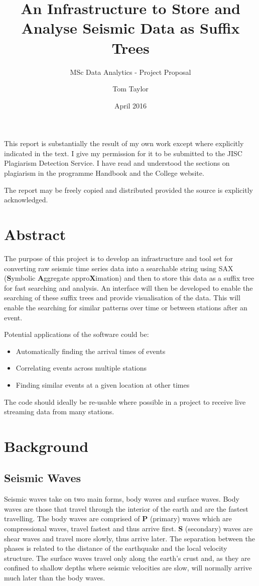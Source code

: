 \documentclass[11pt]{scrartcl}
\title{An Infrastructure to Store and Analyse Seismic Data as Suffix Trees}
\subtitle{MSc Data Analytics - Project Proposal}
\date{April 2016}
\author{Tom Taylor}
\begin{document}
\maketitle
\begin{itshape}
	\noindent This report is substantially the result of my own work except where explicitly indicated in the text. I give my permission for it to be submitted to the JISC Plagiarism Detection Service. I have read and understood the sections on plagiarism in the programme Handbook and the College website.
	
	\noindent The report may be freely copied and distributed provided the source is explicitly acknowledged.
\end{itshape}

\tableofcontents

\newpage

\section{Abstract}
	The purpose of this project is to develop an infrastructure and tool set for converting raw seismic time series data into a searchable string using SAX (\textbf{S}ymbolic \textbf{A}ggregate appro\textbf{X}imation) and then to store this data as a suffix tree for fast searching and analysis.  An interface will then be developed to enable the searching of these suffix trees and provide visualisation of the data.  This will enable the searching for similar patterns over time or between stations after an event.
	
	\noindent Potential applications of the software could be:
	\begin{itemize}
		\item Automatically finding the arrival times of events
		\item Correlating events across multiple stations
		\item Finding similar events at a given location at other times
	\end{itemize}
	
	The code should ideally be re-usable where possible in a project to receive live streaming data from many stations.
	
\section{Background}
\subsection{Seismic Waves}
	Seismic waves take on two main forms, body waves and surface waves.  Body waves are those that travel through the interior of the earth and are the fastest travelling.  The body waves are comprised of \textbf{P} (primary) waves which are compressional waves, travel fastest and thus arrive first.  \textbf{S} (secondary) waves are shear waves and travel more slowly, thus arrive later.  The separation between the phases is related to the distance of the earthquake and the local velocity structure. The surface waves travel only along the earth’s crust and, as they are confined to shallow depths where seismic velocities are slow, will normally arrive much later than the body waves.
	
\end{document}
